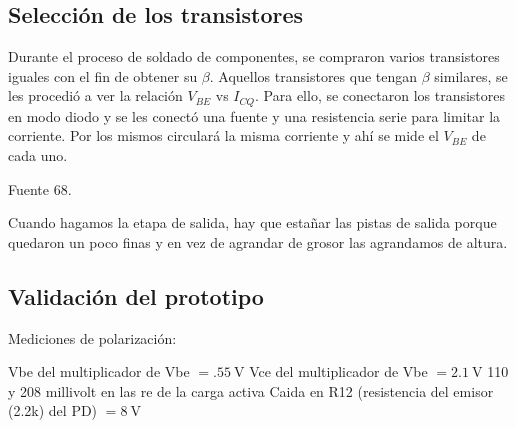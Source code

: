 
	\subsection{Selección de los transistores}
		Durante el proceso de soldado de componentes, se compraron varios transistores iguales con el fin de obtener su $\beta$. Aquellos transistores que tengan $\beta$ similares, se les procedió a ver la relación $V_{BE}$ vs $I_{CQ}$. Para ello, se conectaron los transistores en modo diodo y se les conectó una fuente y una resistencia serie para limitar la corriente. Por los mismos circulará la misma corriente y ahí se mide el $V_{BE}$ de cada uno.

	Fuente 68.

	Cuando hagamos la etapa de salida, hay que estañar las pistas de salida porque quedaron un poco finas y en vez de agrandar de grosor las agrandamos de altura.


	\subsection{Validación del prototipo}

		Mediciones de polarización:

		Vbe del multiplicador de Vbe $= \SI{.55}{\volt}$
		Vce del multiplicador de Vbe $= \SI{2.1}{\volt}$
		110 y 208 millivolt en las re de la carga activa
		Caida en R12 (resistencia del emisor (2.2k) del PD) $= \SI{8}{\volt}$
		
